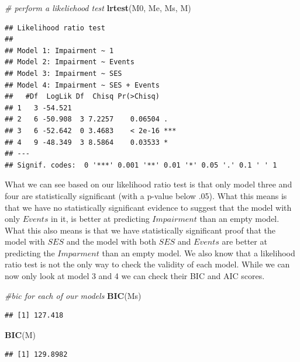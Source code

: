 \documentclass[
]{article}
\newenvironment{Shaded}{\begin{snugshade}}{\end{snugshade}}
\newcommand{\CommentTok}[1]{\textcolor[rgb]{0.56,0.35,0.01}{\textit{#1}}}
\newcommand{\FunctionTok}[1]{\textcolor[rgb]{0.13,0.29,0.53}{\textbf{#1}}}
\newcommand{\NormalTok}[1]{#1}
\begin{document}
\begin{Shaded}
\begin{Highlighting}[]
\CommentTok{\# perform a likeliehood test }
\FunctionTok{lrtest}\NormalTok{(M0, Me, Ms, M)}
\end{Highlighting}
\end{Shaded}

\begin{verbatim}
## Likelihood ratio test
## 
## Model 1: Impairment ~ 1
## Model 2: Impairment ~ Events
## Model 3: Impairment ~ SES
## Model 4: Impairment ~ SES + Events
##   #Df  LogLik Df  Chisq Pr(>Chisq)    
## 1   3 -54.521                         
## 2   6 -50.908  3 7.2257    0.06504 .  
## 3   6 -52.642  0 3.4683    < 2e-16 ***
## 4   9 -48.349  3 8.5864    0.03533 *  
## ---
## Signif. codes:  0 '***' 0.001 '**' 0.01 '*' 0.05 '.' 0.1 ' ' 1
\end{verbatim}

What we can see based on our likelihood ratio test is that only model
three and four are statistically significant (with a p-value below .05).
What this means is that we have no statistically significant evidence to
suggest that the model with only \(Events\) in it, is better at
predicting \(Impairment\) than an empty model. What this also means is
that we have statistically significant proof that the model with \(SES\)
and the model with both \(SES\) and \(Events\) are better at predicting
the \(Imparment\) than an empty model. We also know that a likelihood
ratio test is not the only way to check the validity of each model.
While we can now only look at model 3 and 4 we can check their BIC and
AIC scores.

\begin{Shaded}
\begin{Highlighting}[]
\CommentTok{\#bic for each of our models}
\FunctionTok{BIC}\NormalTok{(Ms)}
\end{Highlighting}
\end{Shaded}

\begin{verbatim}
## [1] 127.418
\end{verbatim}

\begin{Shaded}
\begin{Highlighting}[]
\FunctionTok{BIC}\NormalTok{(M)}
\end{Highlighting}
\end{Shaded}

\begin{verbatim}
## [1] 129.8982
\end{verbatim}
\end{document}

